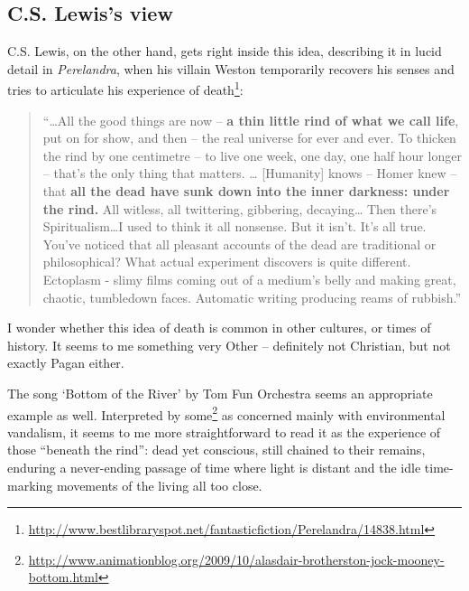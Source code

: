 \documentclass[english,showtrims, 10pt]{memoir}
\renewcommand{\href}[2]{#2\footnote{\raggedright\url{#1}}}
\begin{document}
\subsection{C.S. Lewis's view}\label{c.s.-lewiss-view}

C.S. Lewis, on the other hand, gets right inside this idea, describing
it in lucid detail in \emph{Perelandra}, when his villain Weston
temporarily recovers his senses and
\href{http://www.bestlibraryspot.net/fantasticfiction/Perelandra/14838.html}{tries
to articulate his experience of death}:

\begin{quote}
``\ldots{}All the good things are now -- \textbf{a thin little rind of
what we call life}, put on for show, and then -- the real universe for
ever and ever. To thicken the rind by one centimetre -- to live one
week, one day, one half hour longer -- that's the only thing that
matters. \ldots{} {[}Humanity{]} knows -- Homer knew -- that \textbf{all
the dead have sunk down into the inner darkness: under the rind.} All
witless, all twittering, gibbering, decaying\ldots{} Then there's
Spiritualism\ldots{}I used to think it all nonsense. But it isn't. It's
all true. You've noticed that all pleasant accounts of the dead are
traditional or philosophical? What actual experiment discovers is quite
different. Ectoplasm - slimy films coming out of a medium's belly and
making great, chaotic, tumbledown faces. Automatic writing producing
reams of rubbish.''
\end{quote}

I wonder whether this idea of death is common in other cultures, or
times of history. It seems to me something very Other -- definitely not
Christian, but not exactly Pagan either.

The song `Bottom of the River' by Tom Fun Orchestra seems an appropriate
example as well. Interpreted by
\href{http://www.animationblog.org/2009/10/alasdair-brotherston-jock-mooney-bottom.html}{some}
as concerned mainly with environmental vandalism, it seems to me more
straightforward to read it as the experience of those ``beneath the
rind'': dead yet conscious, still chained to their remains, enduring a
never-ending passage of time where light is distant and the idle
time-marking movements of the living all too close. 

 
\end{document}
